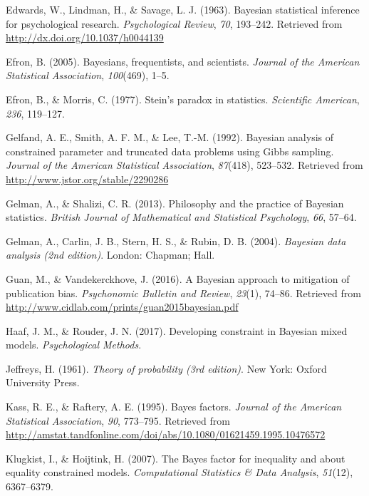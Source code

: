\documentclass[english,man]{apa6}
\theoremstyle{definition}
\theoremstyle{definition}
\theoremstyle{definition}
\theoremstyle{remark}
\begin{document}
\hypertarget{ref-Edwards:etal:1963}{}
Edwards, W., Lindman, H., \& Savage, L. J. (1963). Bayesian statistical
inference for psychological research. \emph{Psychological Review},
\emph{70}, 193--242. Retrieved from
\url{http://dx.doi.org/10.1037/h0044139}

\hypertarget{ref-Efron:2005}{}
Efron, B. (2005). Bayesians, frequentists, and scientists. \emph{Journal
of the American Statistical Association}, \emph{100}(469), 1--5.

\hypertarget{ref-Efron:Morris:1977}{}
Efron, B., \& Morris, C. (1977). Stein's paradox in statistics.
\emph{Scientific American}, \emph{236}, 119--127.

\hypertarget{ref-Gelfand:etal:1992}{}
Gelfand, A. E., Smith, A. F. M., \& Lee, T.-M. (1992). Bayesian analysis
of constrained parameter and truncated data problems using Gibbs
sampling. \emph{Journal of the American Statistical Association},
\emph{87}(418), 523--532. Retrieved from
\url{http://www.jstor.org/stable/2290286}

\hypertarget{ref-Gelman:Shalizi:2013}{}
Gelman, A., \& Shalizi, C. R. (2013). Philosophy and the practice of
Bayesian statistics. \emph{British Journal of Mathematical and
Statistical Psychology}, \emph{66}, 57--64.

\hypertarget{ref-Gelman:etal:2004}{}
Gelman, A., Carlin, J. B., Stern, H. S., \& Rubin, D. B. (2004).
\emph{Bayesian data analysis (2nd edition)}. London: Chapman; Hall.

\hypertarget{ref-Guan:Vandekerckhove:2016}{}
Guan, M., \& Vandekerckhove, J. (2016). A Bayesian approach to
mitigation of publication bias. \emph{Psychonomic Bulletin and Review},
\emph{23}(1), 74--86. Retrieved from
\url{http://www.cidlab.com/prints/guan2015bayesian.pdf}

\hypertarget{ref-Haaf:Rouder:2017}{}
Haaf, J. M., \& Rouder, J. N. (2017). Developing constraint in Bayesian
mixed models. \emph{Psychological Methods}.

\hypertarget{ref-Jeffreys:1961}{}
Jeffreys, H. (1961). \emph{Theory of probability (3rd edition)}. New
York: Oxford University Press.

\hypertarget{ref-Kass:Raftery:1995}{}
Kass, R. E., \& Raftery, A. E. (1995). Bayes factors. \emph{Journal of
the American Statistical Association}, \emph{90}, 773--795. Retrieved
from
\url{http://amstat.tandfonline.com/doi/abs/10.1080/01621459.1995.10476572}

\hypertarget{ref-Klugkist:Hoijtink:2007}{}
Klugkist, I., \& Hoijtink, H. (2007). The Bayes factor for inequality
and about equality constrained models. \emph{Computational Statistics \&
Data Analysis}, \emph{51}(12), 6367--6379.
\end{document}
